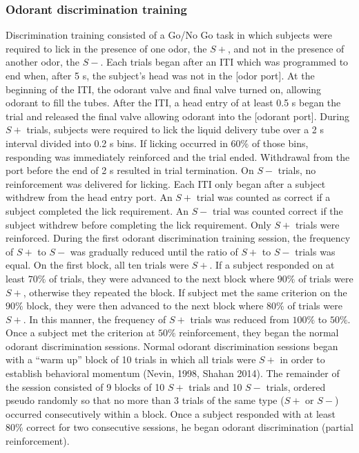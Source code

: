\subsubsection{Odorant discrimination training}
\label{sec:methods_training}
Discrimination training consisted of a Go/No Go task in which subjects were required to lick in the presence of one odor, the $S+$, and not in the presence of another odor, the $S-$.  Each trials began after an ITI which was programmed to end when, after 5 s, the subject’s head was not in the [odor port]. At the beginning of the ITI, the odorant valve and final valve turned on, allowing odorant to fill the tubes. After the ITI, a head entry of at least 0.5 s began the trial and released the final valve allowing odorant into the [odorant port]. During $S+$ trials, subjects were required to lick the liquid delivery tube over a 2 s interval divided into 0.2 s bins. If licking occurred in $60\%$ of those bins, responding was immediately reinforced and the trial ended. Withdrawal from the port before the end of 2 s resulted in trial termination. On $S-$ trials, no reinforcement was delivered for licking. Each ITI only began after a subject withdrew from the head entry port. An $S+$ trial was counted as correct if a subject completed the lick requirement. An $S-$ trial was counted correct if the subject withdrew before completing the lick requirement. Only $S+$ trials were reinforced.
During the first odorant discrimination training session, the frequency of $S+$ to $S-$ was gradually reduced until the ratio of $S+$ to $S-$ trials was equal. On the first block, all ten trials were $S+$. If a subject responded on at least $70\%$ of trials, they were advanced to the next block where $90\%$ of trials were $S+$, otherwise they repeated the block. If subject met the same criterion on the $90\%$ block, they were then advanced to the next block where $80\%$ of trials were $S+$. In this manner, the frequency of $S+$ trials was reduced from $100\%$ to $50\%$.  Once a subject met the criterion at $50\%$ reinforcement, they began the normal odorant discrimination sessions.
Normal odorant discrimination sessions began with a ``warm up'' block of 10 trials in which all trials were $S+$ in order to establish behavioral momentum (Nevin, 1998, Shahan 2014).  The remainder of the session consisted of 9 blocks of 10 $S+$ trials and 10 $S-$ trials, ordered pseudo randomly so that no more than 3 trials of the same type ($S+$ or $S-$) occurred consecutively within a block. Once a subject responded with at least $80\%$ correct for two consecutive sessions, he began odorant discrimination (partial reinforcement).

